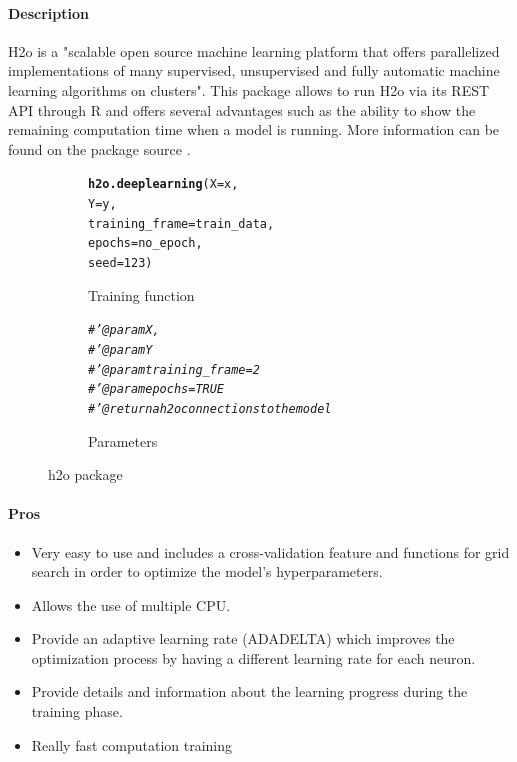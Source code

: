 \documentclass[letter,8pt]{article}\usepackage[]{graphicx}\usepackage[]{color}
\makeatletter
\newcommand{\hlnum}[1]{\textcolor[rgb]{0.686,0.059,0.569}{#1}}%
\newcommand{\hlcom}[1]{\textcolor[rgb]{0.678,0.584,0.686}{\textit{#1}}}%
\newcommand{\hlstd}[1]{\textcolor[rgb]{0.345,0.345,0.345}{#1}}%
\newcommand{\hlkwc}[1]{\textcolor[rgb]{0.333,0.667,0.333}{#1}}%
\newcommand{\hlkwd}[1]{\textcolor[rgb]{0.737,0.353,0.396}{\textbf{#1}}}%
\newenvironment{kframe}{%
 \def\at@end@of@kframe{}%
 \ifinner\ifhmode%
  \def\at@end@of@kframe{\end{minipage}}%
  \begin{minipage}{\columnwidth}%
 \fi\fi%
 \def\FrameCommand##1{\hskip\@totalleftmargin \hskip-\fboxsep
 \colorbox{shadecolor}{##1}\hskip-\fboxsep
     \hskip-\linewidth \hskip-\@totalleftmargin \hskip\columnwidth}%
 \MakeFramed {\advance\hsize-\width
   \@totalleftmargin\z@ \linewidth\hsize
   \@setminipage}}%
 {\par\unskip\endMakeFramed%
 \at@end@of@kframe}
\newenvironment{knitrout}{}{} %
\makeatother
\begin{document}
\paragraph{Description}
H2o is a "scalable open source machine learning platform that offers parallelized implementations of many supervised, unsupervised and fully automatic machine learning algorithms on clusters". This package allows to run H2o via its REST API through R and offers several advantages such as the ability to show the remaining computation time when a model is running.
More information can be found on the package source \cite{h2o2020}.


\begin{figure}[H]
  \begin{subfigure}{0.5\textwidth}
\begin{knitrout}
\color{fgcolor}\begin{kframe}
\begin{alltt}
\hlkwd{h2o.deeplearning}\hlstd{(}\hlkwc{X} \hlstd{= x,}
                  \hlkwc{Y} \hlstd{= y,}
                  \hlkwc{training_frame} \hlstd{= train_data,}
                  \hlkwc{epochs} \hlstd{= no_epoch,}
                  \hlkwc{seed}\hlstd{=}\hlnum{123}\hlstd{)}
\end{alltt}
\end{kframe}
\end{knitrout}
    \caption{Training function}
  \end{subfigure}
  \begin{subfigure}{0.5\textwidth}
    \centering
\begin{knitrout}
\color{fgcolor}\begin{kframe}
\begin{alltt}
\hlcom{#' @param X,}
\hlcom{#' @param Y}
\hlcom{#' @param training_frame=2}
\hlcom{#' @param epochs=TRUE}
\hlcom{#' @return a h2o connections to the model}
\end{alltt}
\end{kframe}
\end{knitrout}
    \caption{Parameters}
  \end{subfigure}
    \caption{h2o package}
\end{figure}

\paragraph{Pros}
\begin{itemize}
\item Very easy to use and includes a cross-validation feature and functions for grid search in order to optimize the model's hyperparameters.
\item Allows the use of multiple CPU.
\item Provide an adaptive learning rate (ADADELTA) which improves the optimization process by having a different learning rate for each neuron.
\item Provide details and information about the learning progress during the training phase.
\item Really fast computation training
\end{itemize}
\end{document}
